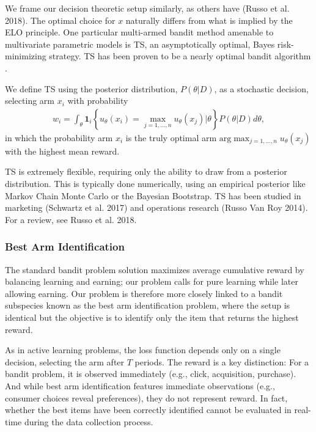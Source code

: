 \documentclass[a4paper,11pt]{article}
\begin{document}
We frame our decision theoretic setup similarly, as others have (Russo et al. 2018). The optimal choice for $x$ naturally differs from what is implied by the ELO principle. One particular multi-armed bandit method amenable to multivariate parametric models is TS, an asymptotically optimal, Bayes risk-minimizing strategy. TS has been proven to be a nearly optimal bandit algorithm \citep{RussoVanRoy2015}. 

We define TS using the posterior distribution, $P(\theta|D)$, as a stochastic decision, selecting arm $x_i$ with probability
\begin{align} 
w_i = \int_\theta \mathbf{1}_i\left\{ u_\theta(x_i) = \max_{j=1,\ldots,n} u_\theta(x_j) | \theta \right\} P(\theta|D)d\theta ,
\end{align}
in which the probability arm $x_i$ is the truly optimal arm $\text{arg}\max_{j=1,\ldots,n} u_\theta(x_j)$ with the highest mean reward. 

TS is extremely flexible, requiring only the ability to draw from a posterior distribution. This is typically done numerically, using an empirical posterior like Markov Chain Monte Carlo or the Bayesian Bootstrap. TS has been studied in marketing (Schwartz et al. 2017) and operations research (Russo Van Roy 2014). For a review, see Russo et al. 2018. 

\subsubsection{Best Arm Identification}

The standard bandit problem solution maximizes average cumulative reward by balancing learning and earning; our problem calls for pure learning while later allowing earning. Our problem is therefore more closely linked to a bandit subspecies known as the best arm identification problem, where the setup is identical but the objective is to identify only the item that returns the highest reward. 

As in active learning problems, the loss function depends only on a single decision, selecting the arm after $T$ periods. The reward is a key distinction: For a bandit problem, it is observed immediately (e.g., click, acquisition, purchase). And while best arm identification features immediate observations (e.g., consumer choices reveal preferences), they do not represent reward. In fact, whether the best items have been correctly identified cannot be evaluated in real-time during the data collection process. 
\end{document}
